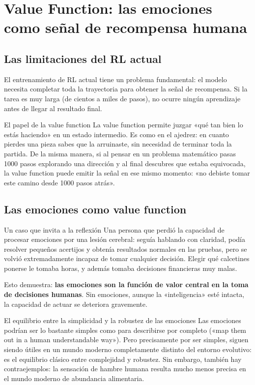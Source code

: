 \documentclass[a4paper]{article}
\begin{document}
\section{Value Function: las emociones como señal de recompensa humana}

\subsection{Las limitaciones del RL actual}

El entrenamiento de RL actual tiene un problema fundamental: el modelo necesita completar toda la trayectoria para obtener la señal de recompensa. Si la tarea es muy larga (de cientos a miles de pasos), no ocurre ningún aprendizaje antes de llegar al resultado final.

\begin{importantbox}{El papel de la value function}
La value function permite juzgar «qué tan bien lo estás haciendo» en un estado intermedio. Es como en el ajedrez: en cuanto pierdes una pieza sabes que la arruinaste, sin necesidad de terminar toda la partida. De la misma manera, si al pensar en un problema matemático pasas 1000 pasos explorando una dirección y al final descubres que estaba equivocada, la value function puede emitir la señal en ese mismo momento: «no debiste tomar este camino desde 1000 pasos atrás».
\end{importantbox}

\subsection{Las emociones como value function}

\begin{importantbox}{Un caso que invita a la reflexión}
Una persona que perdió la capacidad de procesar emociones por una lesión cerebral: seguía hablando con claridad, podía resolver pequeños acertijos y obtenía resultados normales en las pruebas, pero se volvió extremadamente incapaz de tomar cualquier decisión. Elegir qué calcetines ponerse le tomaba horas, y además tomaba decisiones financieras muy malas.

Esto demuestra: \textbf{las emociones son la función de valor central en la toma de decisiones humanas}. Sin emociones, aunque la «inteligencia» esté intacta, la capacidad de actuar se deteriora gravemente.
\end{importantbox}

\begin{knowledgebox}{El equilibrio entre la simplicidad y la robustez de las emociones}
Las emociones podrían ser lo bastante simples como para describirse por completo («map them out in a human understandable way»). Pero precisamente por ser simples, siguen siendo útiles en un mundo moderno completamente distinto del entorno evolutivo: es el equilibrio clásico entre complejidad y robustez. Sin embargo, también hay contraejemplos: la sensación de hambre humana resulta mucho menos precisa en el mundo moderno de abundancia alimentaria.
\end{knowledgebox}
\end{document}
